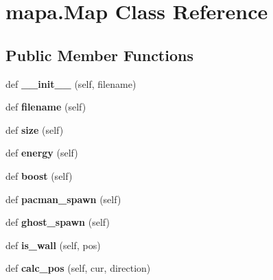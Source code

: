 \hypertarget{classmapa_1_1_map}{}\section{mapa.\+Map Class Reference}
\label{classmapa_1_1_map}
\subsection*{Public Member Functions}
\begin{DoxyCompactItemize}
\item 
\mbox{\label{classmapa_1_1_map_a943581916c638061d596f0245ef8f964}} 
def {\bfseries \+\_\+\+\_\+init\+\_\+\+\_\+} (self, filename)
\item 
\mbox{\label{classmapa_1_1_map_a39270dbc0fad2fb4eacec905707f52eb}} 
def {\bfseries filename} (self)
\item 
\mbox{\label{classmapa_1_1_map_a6a22a7867a340de92eac35c379af35af}} 
def {\bfseries size} (self)
\item 
\mbox{\label{classmapa_1_1_map_a239d83810c3b0e70956d073084f6bcf7}} 
def {\bfseries energy} (self)
\item 
\mbox{\label{classmapa_1_1_map_a13aaa9f08e68aa6b34b7ace4b96b542e}} 
def {\bfseries boost} (self)
\item 
\mbox{\label{classmapa_1_1_map_a27d4d62e534dbcd47b85816014200f83}} 
def {\bfseries pacman\+\_\+spawn} (self)
\item 
\mbox{\label{classmapa_1_1_map_aa73f245fba71050a19ae11e1211e9d5f}} 
def {\bfseries ghost\+\_\+spawn} (self)
\item 
\mbox{\label{classmapa_1_1_map_a566ef2bd0eb33c6915a328270b280188}} 
def {\bfseries is\+\_\+wall} (self, pos)
\item 
\mbox{\label{classmapa_1_1_map_a0617b38834a12bdb69604ac93ec40407}} 
def {\bfseries calc\+\_\+pos} (self, cur, direction)
\end{DoxyCompactItemize}
